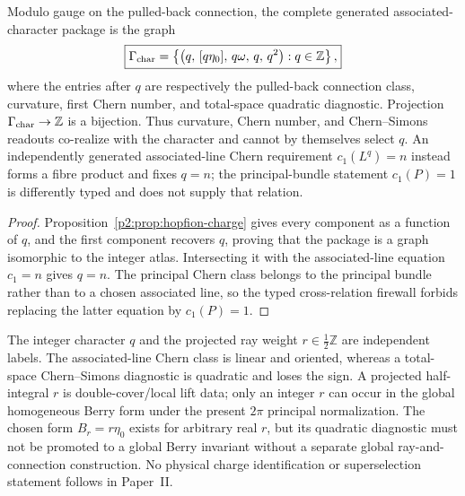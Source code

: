 \documentclass[12pt,a4paper]{article}
\begin{document}
\begin{corollary}
\label{p2d:cor:associated-character-readout-graph}
Modulo gauge on the pulled-back connection, the complete generated
associated-character package is the graph
\[
 \boxed{
 \Gamma_{\rm char}
 =
 \left\{
 \left(q,\,[q\eta_0],\,q\omega,\,q,\,q^2\right):
 q\in\mathbb Z
 \right\},}
\]
where the entries after \(q\) are respectively the pulled-back connection
class, curvature, first Chern number, and total-space quadratic diagnostic.
Projection \(\Gamma_{\rm char}\to\mathbb Z\) is a bijection.  Thus curvature,
Chern number, and Chern--Simons readouts co-realize with the character and
cannot by themselves select \(q\).  An independently generated associated-line
Chern requirement \(c_1(L^q)=n\) instead forms a fibre product and fixes
\(q=n\); the principal-bundle statement \(c_1(P)=1\) is differently typed and
does not supply that relation.
\end{corollary}

\begin{proof}
Proposition~\ref{p2:prop:hopfion-charge} gives every component as a function of
\(q\), and the first component recovers \(q\), proving that the package is a
graph isomorphic to the integer atlas.  Intersecting it with the
associated-line equation \(c_1=n\) gives \(q=n\).  The principal Chern class
belongs to the principal bundle rather than to a chosen associated line, so
the typed cross-relation firewall forbids replacing the latter equation by
\(c_1(P)=1\).
\end{proof}

\begin{remark}
\label{p2:rem:hopf-normalization-conversion}
The integer character \(q\) and the projected ray weight
\(r\in\frac12\mathbb Z\) are independent labels.  The associated-line Chern
class is linear and oriented, whereas a total-space Chern--Simons diagnostic
is quadratic and loses the sign.  A projected half-integral \(r\) is
double-cover/local lift data; only an integer \(r\) can occur in the global
homogeneous Berry form under the present \(2\pi\) principal normalization.
The chosen form \(B_r=r\eta_0\) exists for arbitrary real \(r\), but its
quadratic diagnostic must not be promoted to a global Berry invariant without
a separate global ray-and-connection construction.  No physical charge
identification or superselection statement follows in Paper~II.
\end{remark}
\end{document}
